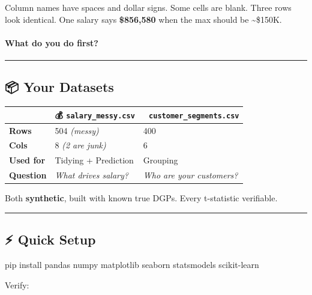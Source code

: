 \documentclass[
]{article}
\newenvironment{Shaded}{\begin{snugshade}}{\end{snugshade}}
\newcommand{\ExtensionTok}[1]{#1}
\newcommand{\NormalTok}[1]{#1}
\begin{document}
Column names have spaces and dollar signs. Some cells are blank. Three
rows look identical. One salary says \textbf{\$856,580} when the max
should be \textasciitilde\$150K.

\paragraph{What do you do first?}\label{what-do-you-do-first}

\begin{center}\rule{0.5\linewidth}{0.5pt}\end{center}

\subsection{📦 Your Datasets}\label{your-datasets}

\begin{longtable}[]{@{}lll@{}}
\toprule\noalign{}
& 💰 \texttt{salary\_messy.csv} & 🛒 \texttt{customer\_segments.csv} \\
\midrule\noalign{}
\endhead
\bottomrule\noalign{}
\endlastfoot
\textbf{Rows} & 504 \emph{(messy)} & 400 \\
\textbf{Cols} & 8 \emph{(2 are junk)} & 6 \\
\textbf{Used for} & Tidying + Prediction & Grouping \\
\textbf{Question} & \emph{What drives salary?} & \emph{Who are your
customers?} \\
\end{longtable}

Both \textbf{synthetic}, built with known true DGPs. Every t-statistic
verifiable.

\begin{center}\rule{0.5\linewidth}{0.5pt}\end{center}

\subsection{⚡ Quick Setup}\label{quick-setup}

\begin{Shaded}
\begin{Highlighting}[]
\ExtensionTok{pip}\NormalTok{ install pandas numpy matplotlib seaborn statsmodels scikit{-}learn}
\end{Highlighting}
\end{Shaded}

Verify:
\end{document}
